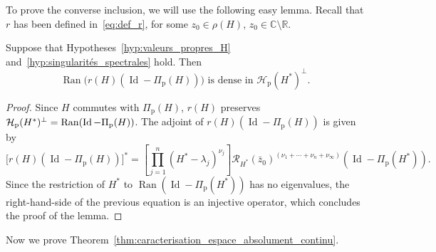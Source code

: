 \documentclass[AHL,Unicode,longabstracts,published]{cedram}
\newcommand{\Hi}{\mathcal{H}}
\newcommand{\bbC}{\mathbb{C}}
\newcommand{\R}{\mathbb{R}}
\newcommand{\rmp}{\mathrm{p}}
\newcommand{\Res}{\mathcal{R}}
\DeclareMathOperator{\Ran}{Ran}
\DeclareMathOperator{\Id}{Id}
\newcommand*\bbC{\mathbb{C}}
\newcommand{\Hi}{\mathcal{H}}
\newcommand{\rmp}{\mathrm{p}}
\newcommand{\R}{\mathbb{R}}
\begin{document}
To prove the converse inclusion, we will use the following easy lemma. Recall that $r$ has been defined in~\eqref{eq:def_r}, for some $z_0\in\rho(H)$, $z_0\in\bbC\setminus\R$.

\begin{lemm}\label{lm:closed_range}
Suppose that Hypotheses~\ref{hyp:valeurs_propres_H} and~\ref{hyp:singularités_spectrales} hold. Then
\begin{equation*}
\Ran\big(r(H)\left(\Id-\Pi_\rmp(H)\right)\big) \text{ is dense in } \Hi_\rmp(H^*)^\perp.
\end{equation*}
\end{lemm}

\begin{proof}
Since $H$ commutes with $\Pi_{\rmp}(H)$, $r(H)$ preserves $\Hi_\rmp(H^*)^\perp=\Ran(\Id-\linebreak\Pi_\rmp(H))$. The adjoint of $r(H)(\Id-\Pi_\rmp(H))$ is given by
\begin{equation*}
\big[r(H)\left(\Id-\Pi_\rmp(H)\right)\big]^* = \left[\prod_{j=1}^n \left(H^*-\lambda_j\right)^{\nu_j} \right] \Res_{H^*}(\bar z_0)^{(\nu_1+\cdots+\nu_n+\nu_\infty)} \left(\Id-\Pi_\rmp(H^*)\right).
\end{equation*}
Since the restriction of $H^*$ to $\Ran(\Id-\Pi_\rmp(H^*))$ has no eigenvalues, the right-hand-side of the previous equation is an injective operator, which concludes the proof of the lemma.
\end{proof}

Now we prove Theorem~\ref{thm:caracterisation_espace_absolument_continu}.
\end{document}
